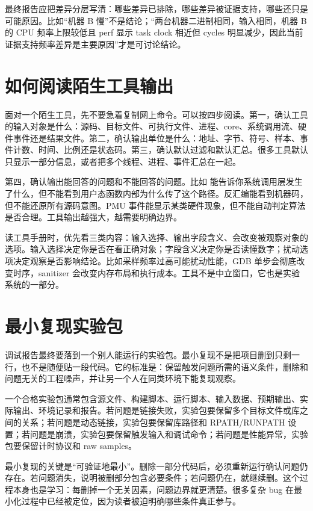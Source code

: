 最终报告应把差异分层写清：哪些差异已排除，哪些差异被证据支持，哪些还只是可能原因。比如“机器 B 慢”不是结论；“两台机器二进制相同，输入相同，机器 B 的 CPU 频率上限较低且 perf 显示 task clock 相近但 cycles 明显减少，因此当前证据支持频率差异是主要原因”才是可讨论结论。

\section{如何阅读陌生工具输出}

面对一个陌生工具，先不要急着复制网上命令。可以按四步阅读。第一，确认工具的输入对象是什么：源码、目标文件、可执行文件、进程、core、系统调用流、硬件事件还是结果文件。第二，确认输出单位是什么：地址、字节、符号、样本、事件计数、时间、比例还是状态码。第三，确认默认过滤和默认汇总。很多工具默认只显示一部分信息，或者把多个线程、进程、事件汇总在一起。

第四，确认输出能回答的问题和不能回答的问题。比如  能告诉你系统调用层发生了什么，但不能看到用户态函数内部为什么传了这个路径。反汇编能看到机器码，但不能还原所有源码意图。PMU 事件能显示某类硬件现象，但不能自动判定算法是否合理。工具输出越强大，越需要明确边界。

读工具手册时，优先看三类内容：输入选择、输出字段含义、会改变被观察对象的选项。输入选择决定你是否在看正确对象；字段含义决定你是否读懂数字；扰动选项决定观察是否影响结论。比如采样频率过高可能扰动性能，GDB 单步会彻底改变时序，sanitizer 会改变内存布局和执行成本。工具不是中立窗口，它也是实验系统的一部分。

\section{最小复现实验包}

调试报告最终要落到一个别人能运行的实验包。最小复现不是把项目删到只剩一行，也不是随便贴一段代码。它的标准是：保留触发问题所需的语义条件，删除和问题无关的工程噪声，并让另一个人在同类环境下能复现观察。

一个合格实验包通常包含源文件、构建脚本、运行脚本、输入数据、预期输出、实际输出、环境记录和报告。若问题是链接失败，实验包要保留多个目标文件或库之间的关系；若问题是动态链接，实验包要保留库路径和 RPATH/RUNPATH 设置；若问题是崩溃，实验包要保留触发输入和调试命令；若问题是性能异常，实验包要保留计时协议和 raw samples。

最小复现的关键是“可验证地最小”。删除一部分代码后，必须重新运行确认问题仍存在。若问题消失，说明被删部分包含必要条件；若问题仍在，就继续删。这个过程本身也是学习：每删掉一个无关因素，问题边界就更清楚。很多复杂 bug 在最小化过程中已经被定位，因为读者被迫明确哪些条件真正参与。

